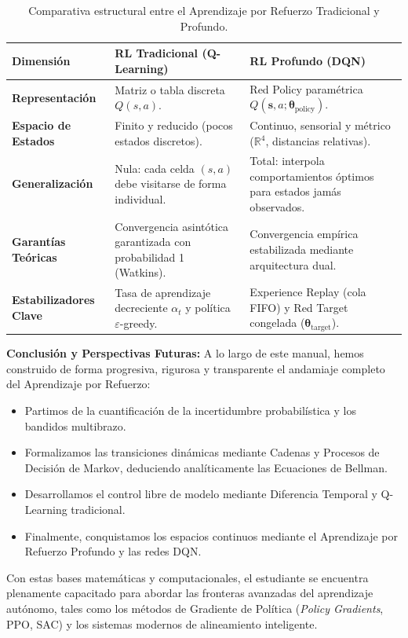 \begin{table}[htbp]
  \centering
  \small
  \begin{tabular}{@{} >{\raggedright\arraybackslash}p{3.4cm} >{\raggedright\arraybackslash}p{5.5cm} >{\raggedright\arraybackslash}p{5.5cm}@{}}
    \toprule
    \textbf{Dimensión} & \textbf{RL Tradicional (Q-Learning)} & \textbf{RL Profundo (DQN)} \\
    \midrule
    \textbf{Representación} & Matriz o tabla discreta $Q(s, a)$. & Red Policy paramétrica $Q(\mathbf{s}, a; \boldsymbol{\theta}_{\text{policy}})$. \\
    \addlinespace
    \textbf{Espacio de Estados} & Finito y reducido (pocos estados discretos). & Continuo, sensorial y métrico ($\mathbb{R}^4$, distancias relativas). \\
    \addlinespace
    \textbf{Generalización} & Nula: cada celda $(s, a)$ debe visitarse de forma individual. & Total: interpola comportamientos óptimos para estados jamás observados. \\
    \addlinespace
    \textbf{Garantías Teóricas} & Convergencia asintótica garantizada con probabilidad 1 (Watkins). & Convergencia empírica estabilizada mediante arquitectura dual. \\
    \addlinespace
    \textbf{Estabilizadores Clave} & Tasa de aprendizaje decreciente $\alpha_t$ y política $\varepsilon$-greedy. & Experience Replay (cola FIFO) y Red Target congelada ($\boldsymbol{\theta}_{\text{target}}$). \\
    \bottomrule
  \end{tabular}
  \caption{Comparativa estructural entre el Aprendizaje por Refuerzo Tradicional y Profundo.}
  \label{tab:comparativa_rl}
\end{table}

\begin{notabox}
\textbf{Conclusión y Perspectivas Futuras:}
A lo largo de este manual, hemos construido de forma progresiva, rigurosa y transparente el andamiaje completo del Aprendizaje por Refuerzo:
\begin{itemize}
  \item Partimos de la cuantificación de la incertidumbre probabilística y los bandidos multibrazo.
  \item Formalizamos las transiciones dinámicas mediante Cadenas y Procesos de Decisión de Markov, deduciendo analíticamente las Ecuaciones de Bellman.
  \item Desarrollamos el control libre de modelo mediante Diferencia Temporal y Q-Learning tradicional.
  \item Finalmente, conquistamos los espacios continuos mediante el Aprendizaje por Refuerzo Profundo y las redes DQN.
\end{itemize}
Con estas bases matemáticas y computacionales, el estudiante se encuentra plenamente capacitado para abordar las fronteras avanzadas del aprendizaje autónomo, tales como los métodos de Gradiente de Política (\textit{Policy Gradients}, PPO, SAC) y los sistemas modernos de alineamiento inteligente.
\end{notabox}
